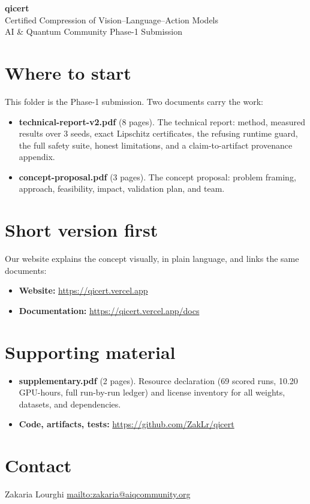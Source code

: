 \documentclass[11pt]{article}
\begin{document}
\begin{center}
{\LARGE\bfseries qicert}\\[4pt]
{\large Certified Compression of Vision--Language--Action Models}\\[2pt]
{\normalsize AI \& Quantum Community \textemdash{} Phase-1 Submission}
\end{center}

\section*{Where to start}

This folder is the Phase-1 submission. Two documents carry the work:

\begin{itemize}
  \item \textbf{technical-report-v2.pdf} (8 pages). The technical report:
  method, measured results over 3 seeds, exact Lipschitz certificates, the
  refusing runtime guard, the full safety suite, honest limitations, and a
  claim-to-artifact provenance appendix.
  \item \textbf{concept-proposal.pdf} (3 pages). The concept proposal:
  problem framing, approach, feasibility, impact, validation plan, and team.
\end{itemize}

\section*{Short version first}

Our website explains the concept visually, in plain language, and links the
same documents:

\begin{itemize}
  \item \textbf{Website:} \url{https://qicert.vercel.app}
  \item \textbf{Documentation:} \url{https://qicert.vercel.app/docs}
\end{itemize}

\section*{Supporting material}

\begin{itemize}
  \item \textbf{supplementary.pdf} (2 pages). Resource declaration (69
  scored runs, 10.20 GPU-hours, full run-by-run ledger) and license
  inventory for all weights, datasets, and dependencies.
  \item \textbf{Code, artifacts, tests:} \url{https://github.com/ZakLr/qicert}
\end{itemize}

\section*{Contact}

Zakaria Lourghi \textemdash{} \url{mailto:zakaria@aiqcommunity.org}
\end{document}

